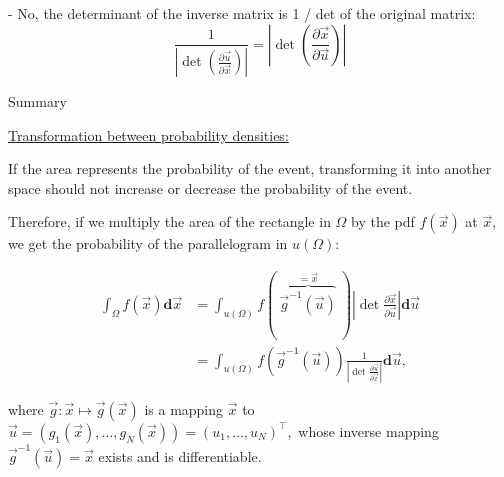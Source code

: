\begin{frame}{\subsubsecname}




\pause

- No, the determinant of the inverse matrix is 1 / det of the original matrix:
\begin{equation}
\frac{1}{\left| \det \left( \frac{\partial \vec u}{\partial \vec x} \right) \right|} =
{\left| \det \left( \frac{\partial \vec x}{\partial \vec u} \right) \right|}
\end{equation}

\end{frame}

\begin{frame}{Summary}

\underline{Transformation between probability densities:}

If the area represents the probability of the event, 
transforming it into another space should not increase or decrease the probability of the event.

Therefore, if we multiply the area of the rectangle in $\Omega$ by the pdf $f(\vec x)$ at $\vec x$, we get the probability of the parallelogram in $u(\Omega)$:

\begin{align}
\int_{\Omega} f(\vec{x}) \mathbf{d}\vec{x}
&=\int_{u(\Omega)} f(~\overbrace{{\vec g^{-1}(\vec u)}}^{= \vec x}~) \left|\det \frac{\partial \vec{x}}{\partial \vec{u}} \right| \mathbf{d}\vec{u}\\
&=\int_{u(\Omega)} f({\vec g^{-1}(\vec u)}) \frac{1}{\left|\det \frac{\partial \vec{u}}{\partial \vec{x}} \right|} \mathbf{d}\vec{u},
\end{align}

where $\vec g:\vec x \mapsto \vec g(\vec x)$ is a mapping  $\vec x$ to $\vec{u}=(g_1({\vec{x}}),\dots,g_N(\vec{x}))=(u_1,\dots,u_N)^{\top},$ whose inverse mapping
 $\vec g^{-1}(\vec{u})=\vec x$ exists and is differentiable.

\end{frame}

